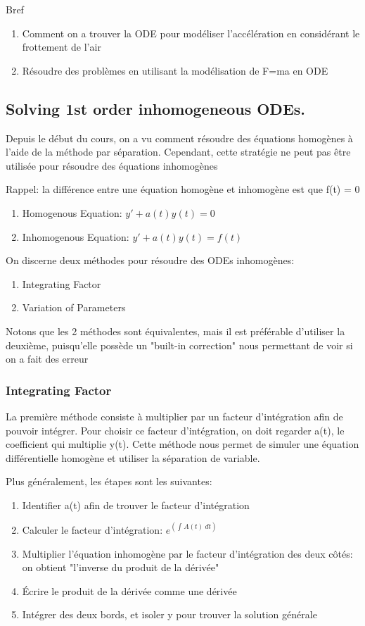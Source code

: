\documentclass{article}
\begin{document}
Bref
\begin{enumerate}
    \item Comment on a trouver la ODE pour modéliser l'accélération
	en considérant le frottement de l'air
    \item Résoudre des problèmes en utilisant la modélisation de F=ma
	en ODE
\end{enumerate}

\subsection{Solving 1st order inhomogeneous ODEs.}

Depuis le début du cours, on a vu comment résoudre des équations homogènes
à l'aide de la méthode par séparation. Cependant, cette stratégie ne peut pas
être utilisée pour résoudre des équations inhomogènes

Rappel: la différence entre une équation homogène et inhomogène est que f(t) = 0
\begin{enumerate}
    \item Homogenous Equation: $ y' + a(t)y(t) = 0 $
    \item Inhomogenous Equation: $ y' + a(t)y(t) = f(t)$
\end{enumerate}

On discerne deux méthodes pour résoudre des ODEs inhomogènes:
\begin{enumerate}
    \item Integrating Factor
    \item Variation of Parameters
\end{enumerate}

Notons que les 2 méthodes sont équivalentes, mais il est préférable d'utiliser
la deuxième, puisqu'elle possède un "built-in correction" nous permettant de
voir si on a fait des erreur

\subsubsection{Integrating Factor}

La première méthode consiste à multiplier par un facteur d'intégration afin de
pouvoir intégrer. Pour choisir ce facteur d'intégration, on doit regarder a(t),
le coefficient qui multiplie y(t). Cette méthode nous permet de simuler
une équation différentielle homogène et utiliser la séparation de variable.

Plus généralement, les étapes sont les suivantes:
\begin{enumerate}
    \item Identifier a(t) afin de trouver le facteur d'intégration
    \item Calculer le facteur d'intégration: $ e^( \int_{{}}^{{}} {A(t)} \:
	d{t} {}) $
    \item Multiplier l'équation inhomogène par le facteur d'intégration des
	deux côtés: on obtient "l'inverse du produit de la dérivée"
    \item Écrire le produit de la dérivée comme une dérivée
    \item Intégrer des deux bords, et isoler y pour trouver la solution
	générale
\end{enumerate}
\end{document}
